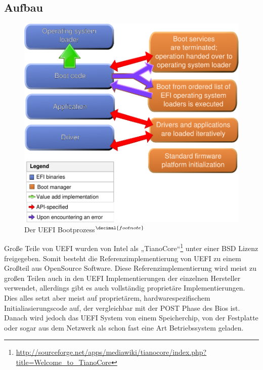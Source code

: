 \documentclass[12pt,ngerman,twopage]{scrartcl}
\begin{document}
\subsection{Aufbau}
\addtocounter{footnote}{1}
\begin{figure}[h]
\includegraphics[width=\linewidth]{EFI-bootprocess}
\caption{Der UEFI Bootprozess$^{\decimal{footnote}}$}

\end{figure}
Große Teile von UEFI wurden von Intel als „TianoCore“\footnote{
\url{http://sourceforge.net/apps/mediawiki/tianocore/index.php?title=Welcome\_to\_TianoCore}} unter einer BSD Lizenz freigegeben. Somit besteht die Referenzimplementierung von UEFI zu einem Großteil aus OpenSource Software. Diese Referenzimplementierung wird meist zu großen Teilen auch in den UEFI Implementierungen der einzelnen Hersteller verwendet, allerdings gibt es auch vollständig proprietäre Implementierungen. Dies alles setzt aber meist auf proprietärem, hardwarespezifischem Initialiasierungscode auf, der vergleichbar mit der POST Phase des Bios ist. Danach wird jedoch das UEFI System von einem Speicherchip, von der Festplatte oder sogar aus dem Netzwerk als schon fast eine Art Betriebssystem geladen.
\end{document}

